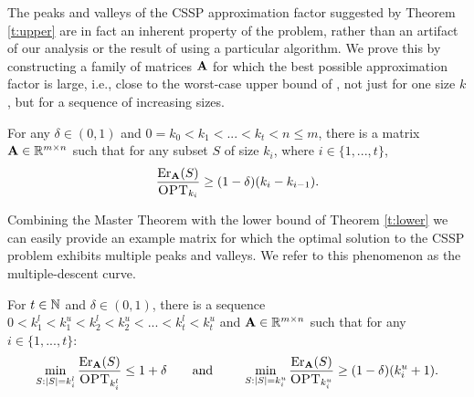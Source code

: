 \documentclass{article}
\begin{document}
The peaks and valleys of the CSSP approximation
factor suggested by Theorem \ref{t:upper} are in fact an
inherent property of the problem, rather than an artifact of our
analysis or the result of using a particular algorithm. We prove this by
constructing a family of matrices $\mathbf A$ for which the best possible approximation
factor is large, i.e., close to the worst-case upper bound of
\citet{pca-volume-sampling}, not just for one size $k$, but for a
sequence of increasing sizes.
 \begin{theorem}\label{t:lower}
For any $\delta\in(0,1)$ and
$0\!=\!k_0\!<\!k_1\!<\!...\!<\!k_t\!<\!n\leq m$, there is a matrix 
$\mathbf A\in\mathbb R^{m\times n}$ such that for any subset $S$ of size $k_i$,
where $i\in\{1,...,t\}$,
\begin{align*}
\frac{\mathrm{Er}_{\mathbf A}(S)}{\textsc{OPT}_{k_i}}\geq (1-\delta)(k_i-k_{i-1}).
  \end{align*}
\end{theorem}
Combining the Master Theorem with the lower
bound of Theorem \ref{t:lower} we can easily provide an example matrix
for which the optimal solution to the CSSP problem exhibits multiple
peaks and valleys. We refer to this phenomenon as the multiple-descent curve.
\begin{corollary}\label{c:multiple-descent}
  For $t\in\mathbb N$ and $\delta\in(0,1)$, there is a
  sequence $0<k_1^l<k_1^u<k_2^l<k_2^u<...<k_t^l<k_t^u$ and
  $\mathbf A\in\mathbb R^{m\times n}$ such that for any $i\in\{1,...,t\}$:
  \begin{align*}
    \min_{S:|S|=k_i^l}\frac{\mathrm{Er}_\mathbf A(S)}{\textsc{OPT}_{k_i^l}}\leq 1+\delta
                                 \qquad\text{and }\qquad
    \min_{S:|S|=k_i^u}\frac{\mathrm{Er}_\mathbf A(S)}{\textsc{OPT}_{k_i^u}} \geq
    (1-\delta)(k_i^u+1).
  \end{align*}
\end{corollary}
\end{document}
